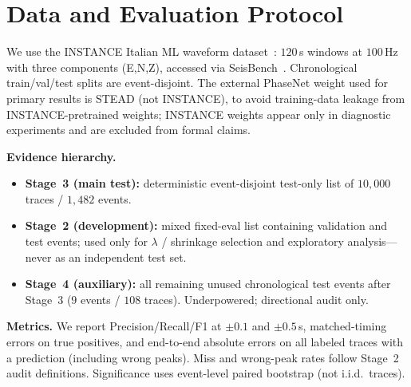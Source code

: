 \section{Data and Evaluation Protocol}
\label{sec:data}

We use the INSTANCE Italian ML waveform dataset~\citep{michelini2021instance}:
$120$\,s windows at $100$\,Hz with three components (E,N,Z), accessed via
SeisBench~\citep{woollam2022seisbench}.
Chronological train/val/test splits are event-disjoint.
The external PhaseNet weight used for primary results is STEAD (not INSTANCE),
to avoid training-data leakage from INSTANCE-pretrained weights; INSTANCE
weights appear only in diagnostic experiments and are excluded from formal
claims.

\textbf{Evidence hierarchy.}
\begin{itemize}
\item \textbf{Stage~3 (main test):} deterministic event-disjoint test-only list
of $10{,}000$ traces / $1{,}482$ events.
\item \textbf{Stage~2 (development):} mixed fixed-eval list containing
validation and test events; used only for $\lambda$ / shrinkage selection and
exploratory analysis---never as an independent test set.
\item \textbf{Stage~4 (auxiliary):} all remaining unused chronological test
events after Stage~3 ($9$ events / $108$ traces). Underpowered; directional
audit only.
\end{itemize}

\textbf{Metrics.}
We report Precision/Recall/F1 at $\pm 0.1$ and $\pm 0.5$\,s, matched-timing
errors on true positives, and end-to-end absolute errors on all labeled traces
with a prediction (including wrong peaks).
Miss and wrong-peak rates follow Stage~2 audit definitions.
Significance uses event-level paired bootstrap (not i.i.d.\ traces).
